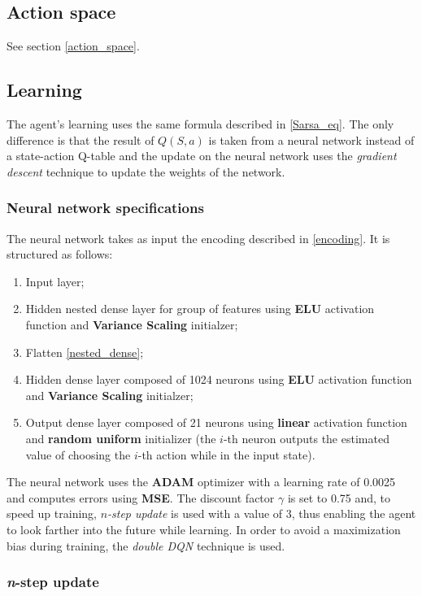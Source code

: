 \documentclass{article}
\begin{document}
\subsection{Action space}

See section \ref{action_space}.

\subsection{Learning}

The agent's learning uses the same formula described in \ref{Sarsa_eq}.
The only difference is that the result of $Q(S, a)$ is taken from a neural network instead of a state-action Q-table and the update on the neural network uses the \textit{gradient descent} technique to update the weights of the network.

\subsubsection{Neural network specifications}

The neural network takes as input the encoding described in \ref{encoding}.
It is structured as follows:
\begin{enumerate}
    \item Input layer;
    \item Hidden nested dense layer for group of features using \textbf{ELU} activation function and \textbf{Variance Scaling} initialzer; \label{nested_dense}
    \item Flatten \ref{nested_dense};
    \item Hidden dense layer composed of 1024 neurons using \textbf{ELU} activation function and \textbf{Variance Scaling} initialzer;
    \item Output dense layer composed of 21 neurons using \textbf{linear} activation function and \textbf{random uniform} initializer (the $i$-th neuron outputs the estimated value of choosing the $i$-th action while in the input state).
\end{enumerate}
The neural network uses the \textbf{ADAM} optimizer with a learning rate of 0.0025 and computes errors using \textbf{MSE}.
The discount factor $\gamma$ is set to 0.75 and, to speed up training, $n$\textit{-step update} is used with a value of 3, thus enabling the agent to look farther into the future while learning.
In order to avoid a maximization bias during training, the \textit{double DQN} technique is used.

\subsubsection{\textit{n}-step update}
\end{document}

